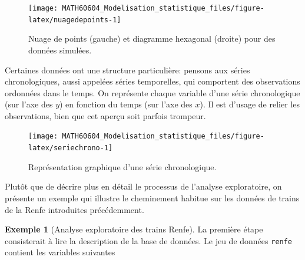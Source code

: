 \documentclass[
  11pt,
  letterpaper,
]{book}
\theoremstyle{definition}
\theoremstyle{definition}
\newtheorem{example}{Exemple}[chapter]
\theoremstyle{definition}
\theoremstyle{remark}
\begin{document}
\begin{figure}

{\centering \texttt{[image: MATH60604\_Modelisation\_statistique\_files/figure-latex/nuagedepoints-1]} 

}

\caption{Nuage de points (gauche) et diagramme hexagonal (droite) pour des données simulées.}\label{fig:nuagedepoints}
\end{figure}

Certaines données ont une structure particulière: pensons aux séries chronologiques, aussi appelées séries temporelles, qui comportent des observations ordonnées dans le temps. On représente chaque variable d'une série chronologique (sur l'axe des \(y\)) en fonction du temps (sur l'axe des \(x\)). Il est d'usage de relier les observations, bien que cet aperçu soit parfois trompeur.

\begin{figure}

{\centering \texttt{[image: MATH60604\_Modelisation\_statistique\_files/figure-latex/seriechrono-1]} 

}

\caption{Représentation graphique d'une série chronologique.}\label{fig:seriechrono}
\end{figure}

Plutôt que de décrire plus en détail le processus de l'analyse exploratoire, on présente un exemple qui illustre le cheminement habitue sur les données de trains de la Renfe introduites précédemment.

\begin{example}[Analyse exploratoire des trains Renfe]
\protect\hypertarget{exm:renfe-aed}{}{\label{exm:renfe-aed} {} }La première étape consisterait à lire la description de la base de données. Le jeu de données \texttt{renfe} contient les variables suivantes
\end{example}
\end{document}
